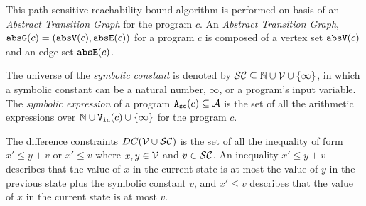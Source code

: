 This path-sensitive reachability-bound algorithm
is performed on basis of an \emph{Abstract Transition Graph} for the program $c$.
An \emph{Abstract Transition Graph}, $\mathtt{abs}{\mathtt{G}}(c) =(\mathtt{abs}{\mathtt{V}}(c), \mathtt{abs}{\mathtt{E}}(c))$ for a program $c$ is composed of
a vertex set $\mathtt{abs}{\mathtt{V}}(c)$ and an edge set $\mathtt{abs}{\mathtt{E}}(c)$.
%
%

\begin{defn}
  \label{def:symbolic_expr}
The universe of the \emph{symbolic constant} is denoted by $\mathcal{SC} \subseteq \mathbb{N} \cup \mathcal{V} \cup \{\infty \}$, in which a symbolic constant can be a natural number, $\infty$, or a program's input variable.
 The \emph{symbolic expression} of a program ${\mathtt{A_{sc}}}(c) \subseteq \mathcal{A}$ is the set of all the arithmetic expressions over $\mathbb{N} \cup {\ensuremath{\mathtt{V_{\mathtt{in}}}}}(c) \cup \{\infty \}$ for the program $c$.
\end{defn}

\begin{defn}
 The difference constraints $DC(\mathcal{V}  \cup \mathcal{SC})$ is the set of all the inequality of
form $x' \leq y + v$ or $x' \leq v$ where $x, y \in \mathcal{V} $ and $v \in \mathcal{SC}$.
An inequality $x' \leq y + v$ describes that the value of $x$ in the current state is
at most the value of $y$ in the previous state plus the symbolic constant $v$, and $x' \leq v$ describes that the value of $x$ in the current state is
at most $v$.
\end{defn}

